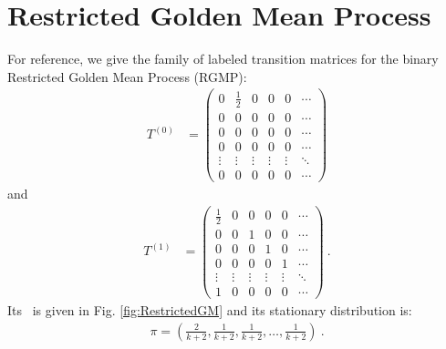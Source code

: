 \documentclass[prl,twocolumn,showpacs,superscriptaddress,preprintnumbers,floatfix]{revtex4}
\theoremstyle{plain}   \newtheorem{Lem}{Lemma}
\theoremstyle{plain} 	\newtheorem{Cor}{Corollary}
\theoremstyle{plain} 	\newtheorem{The}{Theorem}
\theoremstyle{plain} 	\newtheorem{Prop}{Proposition}
\theoremstyle{plain} 	\newtheorem*{Conj}{Conjecture}
\theoremstyle{plain}	\newtheorem*{Rem}{Remark}
\theoremstyle{plain}	\newtheorem*{Def}{Definition}
\theoremstyle{plain}	\newtheorem*{Not}{Notation}
\begin{document}
\section{Restricted Golden Mean Process}

For reference, we give the family of labeled transition matrices
for the binary Restricted Golden Mean Process (RGMP):
\begin{align*}
T^{(0)} & = \begin{pmatrix}
0 & \frac{1}{2} & 0 & 0 & 0 &\cdots\\
0 & 0 & 0 & 0 & 0 & \cdots\\
0 & 0 & 0 & 0 & 0 & \cdots\\
0 & 0 & 0 & 0 & 0 & \cdots\\
\vdots & \vdots & \vdots & \vdots & \vdots & \ddots\\
0 & 0 & 0 & 0 & 0 & \cdots
\end{pmatrix}
\end{align*}
and
\begin{align*}
T^{(1)} & = \begin{pmatrix}
\frac{1}{2} & 0 & 0 & 0 & 0 &\cdots\\
0 & 0 & 1 & 0 & 0 & \cdots\\
0 & 0 & 0 & 1 & 0 & \cdots\\
0 & 0 & 0 & 0 & 1 & \cdots\\
\vdots & \vdots & \vdots & \vdots & \vdots & \ddots\\
1 & 0 & 0 & 0 & 0 & \cdots
\end{pmatrix} ~.
\end{align*}
Its \eM\ is given in Fig. \ref{fig:RestrictedGM} and its stationary
distribution is:
\begin{align*}
\pi = \left(\frac{2}{k+2}, \frac{1}{k+2}, \frac{1}{k+2},
  \ldots, \frac{1}{k+2}\right) ~.
\end{align*}
\end{document}
